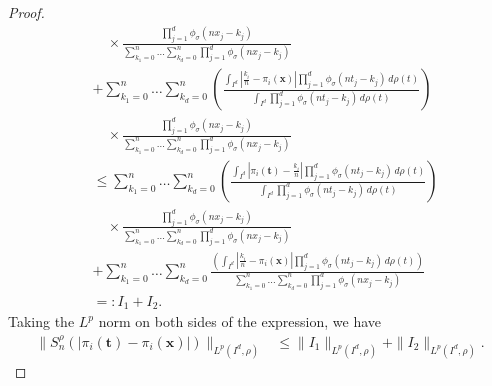 \documentclass[12pt, reqno]{amsart}
\numberwithin{equation}{section}
\theoremstyle{definition}
\theoremstyle{remark}
\numberwithin{equation}{section}
\newcommand{\X}{\mathbf{x}}
\newcommand{\LP}{L^p(I^d, \rho)}
\begin{document}
\begin{proof}
\begin{align*}
&\quad  \times \frac{\prod_{j=1}^d \phi_\sigma(nx_j - k_j)}{\sum_{k_1=0}^n \ldots \sum_{k_d=0}^n \prod_{j=1}^d \phi_\sigma(nx_j - k_j)}  \\
&+   \sum_{k_1=0}^n \ldots \sum_{k_d=0}^n \left( \frac{\int_{I^d} \left| \frac{k_i}{n} - \pi_i(\X) \right| \prod_{j=1}^d \phi_\sigma(nt_j - k_j) \, d\rho(t)}{\int_{I^d} \prod_{j=1}^d \phi_\sigma(nt_j - k_j) \, d\rho(t)} \right) \\
&\quad  \times \frac{\prod_{j=1}^d \phi_\sigma(nx_j - k_j)}{\sum_{k_1=0}^n \ldots \sum_{k_d=0}^n \prod_{j=1}^d \phi_\sigma(nx_j - k_j)} \\
&\leq \sum_{k_1=0}^n \ldots \sum_{k_d=0}^n \left( \frac{\int_{I^d} |\pi_i(\mathbf{t}) - \frac{k_i}{n}| \prod_{j=1}^d \phi_\sigma(nt_j - k_j) \, d\rho(t)}{\int_{I^d} \prod_{j=1}^d \phi_\sigma(nt_j - k_j) \, d\rho(t)} \right)  \\
&\quad  \times \frac{\prod_{j=1}^d \phi_\sigma(nx_j - k_j)}{\sum_{k_1=0}^n \ldots \sum_{k_d=0}^n \prod_{j=1}^d \phi_\sigma(nx_j - k_j)}  \\
&+ \sum_{k_1=0}^n \ldots \sum_{k_d=0}^n \frac{\left( \int_{I^d} \left| \frac{k_i}{n} - \pi_i(\X) \right| \prod_{j=1}^d \phi_\sigma(nt_j - k_j) \, d\rho(t) \right)}{\sum_{k_1=0}^n \ldots \sum_{k_d=0}^n \prod_{j=1}^d \phi_\sigma(nx_j - k_j)} \\
&=: I_1 + I_2.
\end{align*} 
Taking the $L^p$ norm on both sides of the expression, we have 
\begin{align} 
\|S^{\rho}_n(|\pi_i(\mathbf{t})-\pi_i(\X)|)\|_{\LP} 
&\leq \|I_1\|_{\LP} + \|I_2\|_{\LP}. \label{msumesti} 
\end{align} 


\end{proof}
\end{document}
